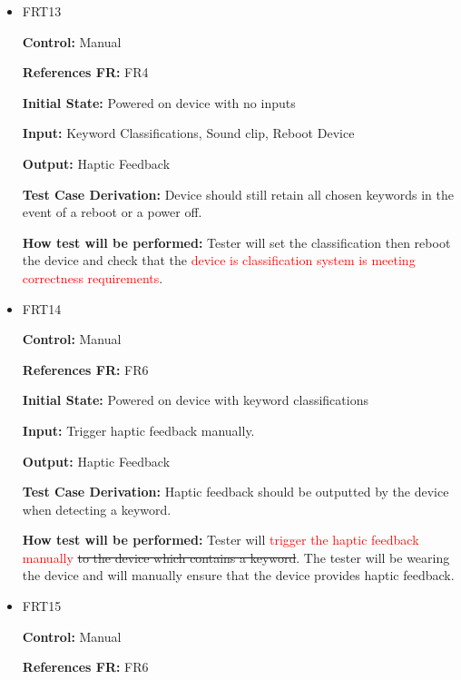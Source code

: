 \documentclass[12pt, titlepage]{article}
\begin{document}
\begin{itemize}

\item{FRT13}

\textbf{Control:} Manual

\textbf{References FR:} FR4 					

\textbf{Initial State:} Powered on device with no inputs
					
\textbf{Input:} Keyword Classifications, Sound clip, Reboot Device
					
\textbf{Output:} Haptic Feedback

\textbf{Test Case Derivation:} Device should still retain all chosen keywords in the event of a reboot or a power off.
					
\textbf{How test will be performed:} Tester will set the classification then reboot the device and check that the \textcolor{red}{device is classification system is meeting correctness requirements}.


\item{FRT14}

\textbf{Control:} Manual

\textbf{References FR:} FR6 					

\textbf{Initial State:} Powered on device with keyword classifications
					
\textbf{Input:} Trigger haptic feedback manually.
					
\textbf{Output:} Haptic Feedback

\textbf{Test Case Derivation:} Haptic feedback should be outputted by the device when detecting a keyword.
					
\textbf{How test will be performed:} Tester will \textcolor{red}{trigger the haptic feedback manually} \sout{to the device which contains a keyword}. The tester will be wearing the device and will manually ensure that the device provides haptic feedback. 


\item{FRT15}

\textbf{Control:} Manual

\textbf{References FR:} FR6 					


\end{itemize}
\end{document}
